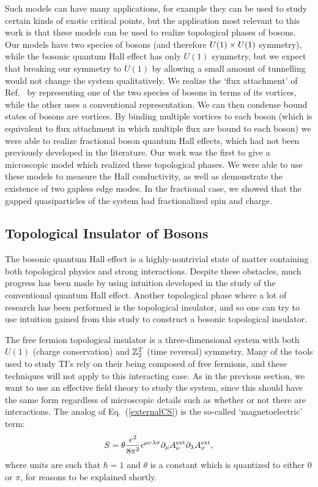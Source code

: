 Such models can have many applications, for example they can be used to study certain kinds of exotic critical points, but the application most relevant to this work is that these models can be used to realize topological phases of bosons. 
Our models have two species of bosons (and therefore $U(1)\times U(1)$ symmetry), while the bosonic quantum Hall effect has only $U(1)$ symmetry, but we expect that breaking our symmetry to $U(1)$ by allowing a small amount of tunnelling would not change the system qualitatively.
We realize the `flux attachment' of Ref.~\cite{SenthilLevin2012} by representing one of the two species of bosons in terms of its vortices, while the other uses a conventional representation. We can then condense bound states of bosons are vortices. 
By binding multiple vortices to each boson (which is equivalent to flux attachment in which multiple flux are bound to each boson) we were able to realize fractional boson quantum Hall effects, which had not been previously developed in the literature.  Our work was the first to give a microscopic model which realized these topological phases. We were able to use these models to measure the Hall conductivity, as well as demonstrate the existence of two gapless edge modes. In the fractional case, we showed that the gapped quasiparticles of the system had fractionalized spin and charge. 

\subsection{Topological Insulator of Bosons}

The bosonic quantum Hall effect is a highly-nontrivial state of matter containing both topological physics and strong interactions. Despite these obstacles, much progress has been made by using intuition developed in the study of the conventional quantum Hall effect. Another topological phase where a lot of research has been performed is the topological insulator, and so one can try to use intuition gained from this study to construct a bosonic topological insulator.

The free fermion topological insulator is a three-dimensional system with both $U(1)$ (charge conservation) and $\mathbb{Z}_2^T$ (time reversal) symmetry. Many of the tools used to study TI's rely on their being composed of free fermions, and these techniques will not apply to this interacting case. As in the previous section, we want to use an effective field theory to study the system, since this should have the same form regardless of microscopic details such as whether or not there are interactions. The analog of Eq.~(\ref{externalCS}) is the so-called `magnetoelectric' term:\cite{QHZ}
\begin{equation}
S=\theta\frac{e^2}{8\pi^2} \epsilon^{\mu\nu\lambda\sigma} \partial_\mu A^{\rm ext}_\nu \partial_\lambda A^{\rm ext}_\sigma,
\label{externEB}
\end{equation}
where units are such that $\hbar=1$ and $\theta$ is a constant which is quantized to either $0$ or $\pi$, for reasons to be explained shortly. 


